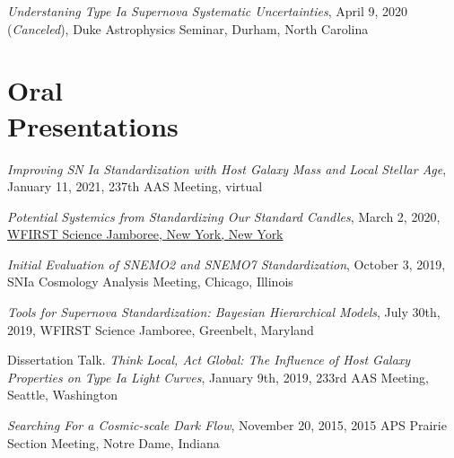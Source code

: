 \documentclass[margin]{res}
\begin{document}
\begin{resume}
\hangindent=15pt 
{\it Understaning Type Ia Supernova Systematic Uncertainties}, April 9, 2020 (\textit{Canceled}), Duke Astrophysics Seminar, Durham, North Carolina




\section{Oral \\Presentations}


\hangindent=15pt 
{\sl Improving SN Ia Standardization with Host Galaxy Mass and Local Stellar Age}, January 11, 2021, 237th AAS Meeting, virtual
\vspace{-12pt}

\hangindent=15pt 
{\sl Potential Systemics from Standardizing Our Standard Candles}, March 2, 2020, \href{https://indico.flatironinstitute.org/event/122/#43-potential-systemics-from-st}{WFIRST Science Jamboree, New York, New York}
\vspace{-12pt}


\hangindent=15pt 
{\sl Initial Evaluation of SNEMO2 and SNEMO7 Standardization}, October 3, 2019, SNIa Cosmology Analysis Meeting, Chicago, Illinois
\vspace{-12pt}

\hangindent=15pt 
{\sl Tools for Supernova Standardization: 
Bayesian Hierarchical Models}, July 30th, 2019,
WFIRST Science Jamboree, Greenbelt, Maryland
\vspace{-12pt}




\hangindent=15pt 
Dissertation Talk. {\sl Think Local, Act Global: The Influence of Host Galaxy Properties on Type Ia Light Curves}, January 9th, 2019,
233rd AAS Meeting, Seattle, Washington
\vspace{-12pt}


\hangindent=15pt 
{\sl Searching For a Cosmic-scale Dark Flow}, November 20, 2015,
2015 APS Prairie Section Meeting, Notre Dame, Indiana
\vspace{-12pt}


\end{resume}
\end{document}
